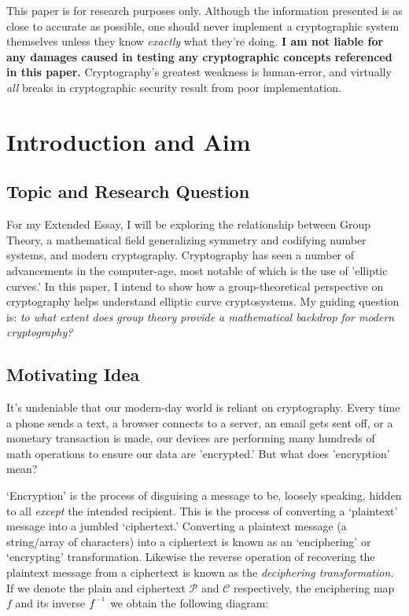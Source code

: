 \documentclass[11pt, a4paper]{report}
\newcommand{\inv}{^{\raisebox{.2em}{$\scriptscriptstyle-1$}}}
\begin{document}
This paper is for research purposes only. Although the information presented is as close to accurate as possible, one should never implement a cryptographic system themselves unless they know \textit{\emph{exactly}} what they're doing. \textbf{I am not liable for any damages caused in testing any cryptographic concepts referenced in this paper.} Cryptography's greatest weakness is human-error, and virtually \textit{all} breaks in cryptographic security result from poor implementation.\autocite{thimbleby}

\section{Introduction and Aim}
\subsection{Topic and Research Question}

For my Extended Essay, I will be exploring the relationship between Group Theory, a mathematical field generalizing symmetry and codifying number systems, and modern cryptography. Cryptography has seen a number of advancements in the computer-age, most notable of which is the use of 'elliptic curves.' In this paper, I intend to show how a group-theoretical perspective on cryptography helps understand elliptic curve cryptosystems. My guiding question is: \textit{to what extent does group theory provide a mathematical backdrop for modern cryptography?}

\subsection{Motivating Idea}
It's undeniable that our modern-day world is reliant on cryptography. Every time a phone sends a text, a browser connects to a server, an email gets sent off, or a monetary transaction is made, our devices are performing many hundreds of math operations to ensure our data are 'encrypted.' But what does 'encryption' mean?

‘Encryption’ is the process of disguising a message to be, loosely speaking, hidden to all \textit{except} the intended recipient. This is the process of converting a ‘plaintext’ message into a jumbled ‘ciphertext.' Converting a plaintext message (a string/array of characters) into a ciphertext is known as an ‘enciphering’ or ‘encrypting’ transformation. Likewise the reverse operation of recovering the plaintext message from a ciphertext is known as the \textit{deciphering transformation.}\autocite[54]{koblitz} If we denote the plain and ciphertext $\mathcal{P}$ and $\mathcal{C}$ respectively, the enciphering map $f$ and its inverse $f\inv$ we obtain the following diagram:
\end{document}
